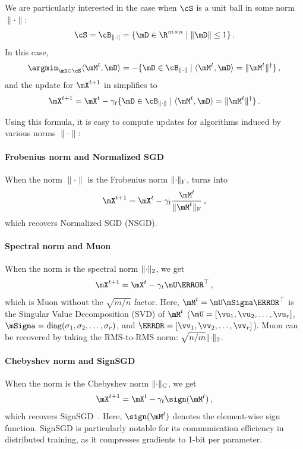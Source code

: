 \documentclass[pmlr]{jmlr}%
\newcommand{\norm}[1]{\lVert #1\rVert}
\DeclarePairedDelimiter{\normf}{\|}{\|_\mathrm{F}}
\DeclarePairedDelimiter{\norms}{\|}{\|_{\mathrm{2}}}
\DeclarePairedDelimiter{\normc}{\|}{\|_{\mathrm{C}}}
\def\<#1,#2>{\langle #1,#2\rangle}
\DeclareMathOperator{\diag}{diag}
\newcommand{\Rmn}{\R^{m\times n}}
\begin{document}
 We are particularly interested in the case when $\cS$ is a unit ball in some norm $\norm{\cdot}$:
 \[
 \cS = \cB_{\norm{\cdot}} = \{ \mD \in \Rmn \mid \norm{\mD} \leq 1 \}\,.
 \]
 In this case,
 \[
 \argmin_{\mD \in \cS} \<\mM^t, \mD> = - \{ \mD \in \cB_{\norm{\cdot}} \mid \<\mM^t, \mD> = \norm{\mM^t}^\dagger\}\,,
 \]
 and the update for $\mX^{t + 1}$ in  simplifies to
 \begin{equation}\label{eq:our_update}
   \mX^{t+1} = \mX^{t} - \gamma_t \{\mD \in \cB_{\norm{\cdot}} \mid \<\mM^t, \mD> = \norm{\mM^t}^\dagger\}\,.
 \end{equation}
 
 Using this formula, it is easy \citep{bernstein2024oldoptimizernewnorm, pethick2025training} to compute updates for algorithms induced by various norms $\norm{\cdot}$:
 
 \paragraph{Frobenius norm and Normalized SGD}
 When the norm $\norm{\cdot}$ is the Frobenius norm $\normf{\cdot}$,  turns into
 \begin{equation}\label{eq:nsgd_update}
   \mX^{t+1} = \mX^{t} - \gamma_t \frac{\mM^t}{\normf{\mM^t}}\,,
 \end{equation}
 which recovers Normalized SGD (NSGD).
 
 \paragraph{Spectral norm and Muon}
 When the norm is the spectral norm $\norms{\cdot}$, we get
 \begin{equation}\label{eq:muon_update}
   \mX^{t+1} = \mX^{t} - \gamma_t \mU \mV^\top\,,
 \end{equation}
 which is Muon without the $\sqrt{m/n}$ factor.
 Here, $\mM^t = \mU \mSigma \mV^\top$ is the Singular Value Decomposition (SVD) of $\mM^t$ ($\mU = [\vu_1, \vu_2, \dots, \vu_r]$, $\mSigma = \diag(\sigma_1, \sigma_2, \dots, \sigma_r)$, and $\mV = [\vv_1, \vv_2, \dots, \vv_r]$). Muon can be recovered by taking the RMS-to-RMS norm: $\sqrt{n/m}\norms{\cdot}$.
 
 \paragraph{Chebyshev norm and SignSGD}
 When the norm is the Chebyshev norm $\normc{\cdot}$, we get
 \begin{equation}\label{eq:signsgd_update}
   \mX^{t+1} = \mX^{t} - \gamma_t \sign(\mM^t)\,,
 \end{equation}
 which recovers SignSGD~\citep{bernstein2018signsgd}. Here, $\sign(\mM^t)$ denotes the element-wise sign function. SignSGD is particularly notable for its communication efficiency in distributed training, as it compresses gradients to 1-bit per parameter.
 
\end{document}
